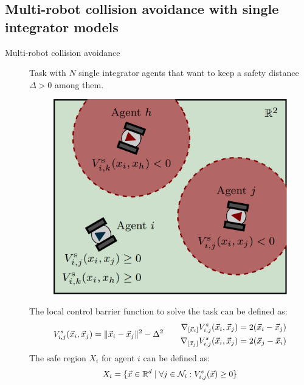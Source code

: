 \subsection{Multi-robot collision avoidance with single integrator models}


\begin{description}
    \item[Multi-robot collision avoidance] 
        Task with $N$ single integrator agents that want to keep a safety distance $\Delta > 0$ among them.

        \begin{figure}[H]
            \centering
            \includegraphics[width=0.35\linewidth]{./img/safety_control_multi.png}
        \end{figure}

        The local control barrier function to solve the task can be defined as:
        \[
            V^s_{i,j}({\vec{x}}_i, {\vec{x}}_j) = \Vert {\vec{x}}_i - {\vec{x}}_j \Vert^2 - \Delta^2
            \qquad
            \begin{aligned}
                \nabla_{[{\vec{x}}_i]} V_{i,j}^s({\vec{x}}_i, {\vec{x}}_j) &= 2({\vec{x}}_i - {\vec{x}}_j) \\
                \nabla_{[{\vec{x}}_j]} V_{i,j}^s({\vec{x}}_i, {\vec{x}}_j) &= 2({\vec{x}}_j - {\vec{x}}_i)
            \end{aligned}
        \]
        The safe region $X_i$ for agent $i$ can be defined as:
        \[
            X_i = \{ {\vec{x}} \in \mathbb{R}^d \mid \forall j \in \mathcal{N}_i: V_{i,j}^s({\vec{x}}) \geq 0 \}
        \]
\end{description}